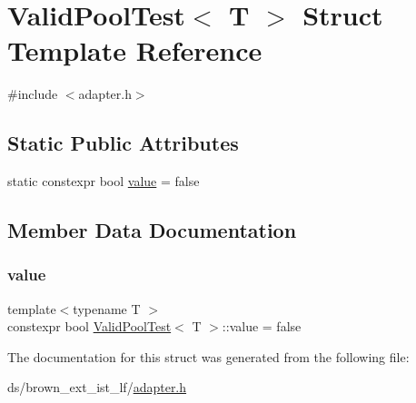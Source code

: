 \hypertarget{structValidPoolTest}{}\section{Valid\+Pool\+Test$<$ T $>$ Struct Template Reference}
\label{structValidPoolTest}


{\ttfamily \#include $<$adapter.\+h$>$}

\subsection*{Static Public Attributes}
\begin{DoxyCompactItemize}
\item 
static constexpr bool \hyperlink{structValidPoolTest_aebaecda6d2189a498a1990f24050c8b2}{value} = false
\end{DoxyCompactItemize}


\subsection{Member Data Documentation}
\mbox{\label{structValidPoolTest_aebaecda6d2189a498a1990f24050c8b2}} 
\subsubsection{\texorpdfstring{value}{value}}
{\footnotesize\ttfamily template$<$typename T $>$ \\
constexpr bool \hyperlink{structValidPoolTest}{Valid\+Pool\+Test}$<$ T $>$\+::value = false\hspace{0.3cm}{\ttfamily [static]}}



The documentation for this struct was generated from the following file\+:\begin{DoxyCompactItemize}
\item 
ds/brown\+\_\+ext\+\_\+ist\+\_\+lf/\hyperlink{brown__ext__ist__lf_2adapter_8h}{adapter.\+h}\end{DoxyCompactItemize}
